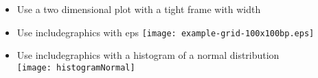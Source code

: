 \documentclass[twocolumn]{article}
\begin{document}
\begin{itemize}
				\frame{}
			\item Use a two dimensional plot with a tight frame with width \the\mylen\\%
		\else
			\item Use includegraphics with eps%
				\texttt{[image: example-grid-100x100bp.eps]}%
		\fi
		\item Use includegraphics with a histogram of a normal distribution\\%
			\texttt{[image: histogramNormal]}%
	\end{itemize}
\end{document}
